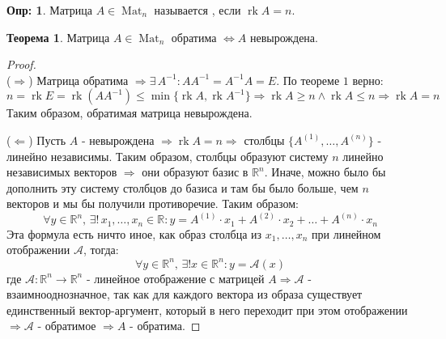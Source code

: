 \documentclass[12pt]{article}
\newcommand{\MR}{\mathbb{R}}
\newcommand{\MA}{\mathcal{A}}
\theoremstyle{definition}
\newtheorem{defn}{Опр:}
\newtheorem{theorem}{Теорема}
\DeclareMathOperator{\rk}{\text{rk}}
\newcommand{\matsq}[1]{\operatorname{Mat}_{#1}}
\begin{document}
\begin{defn}
	Матрица $A \in \matsq{n}$ называется , если $\rk{A} = n$.
\end{defn}

\begin{theorem}
	Матрица $A \in \matsq{n}$ обратима $\Leftrightarrow A$ невырождена.
\end{theorem}
\begin{proof}\hfill\\
	($\Rightarrow$) Матрица обратима $\Rightarrow \exists \, A^{-1} \colon AA^{-1} = A^{-1}A = E$. По теореме $1$ верно: 
	$$
		n = \rk{E} = \rk{(AA^{-1})} \leq \min\{\rk{A},\rk{A^{-1}}\} \Rightarrow \rk{A} \geq n \wedge \rk{A} \leq n \Rightarrow \rk{A} = n
	$$
	Таким образом, обратимая матрица невырождена.
	
	($\Leftarrow$) Пусть $A$ - невырождена $\Rightarrow \rk{A} = n \Rightarrow$  столбцы $\{A^{(1)}, \dotsc, A^{(n)}\}$ - линейно независимы. Таким образом, столбцы образуют систему $n$ линейно независимых векторов $\Rightarrow$ они образуют базис в $\MR^n$. Иначе, можно было бы дополнить эту систему столбцов до базиса и там бы было больше, чем $n$ векторов и мы бы получили противоречие. Таким образом:
	$$
		\forall y \in \MR^n, \, \exists! \, x_1, \dotsc, x_n \in \MR \colon y = A^{(1)}{\cdot}x_1 + A^{(2)}{\cdot}x_2 + \dotsc + A^{(n)}{\cdot}x_n
	$$
	Эта формула есть ничто иное, как образ столбца из $x_1,\dotsc, x_n$ при линейном отображении $\MA$, тогда:
	$$
		\forall y \in \MR^n, \, \exists! x \in \MR^n \colon y = \MA(x)
	$$
	где $\MA \colon \MR^n \to \MR^n$ - линейное отображение с матрицей $A \Rightarrow \MA$ - взаимнооднозначное, так как для каждого вектора из образа существует единственный вектор-аргумент, который в него переходит при этом отображении $\Rightarrow \MA$ - обратимое $\Rightarrow A$ - обратима.
\end{proof}
\end{document}
